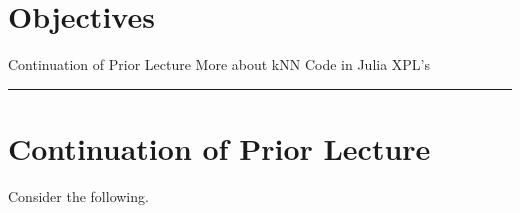 
\section*{Objectives}
\begin{outline}
    \1 Continuation of Prior Lecture
    \1 More about kNN
    \1 Code in Julia
    \1 XPL's
\end{outline}

\rule[0.0051in]{\textwidth}{0.00025in}
\section{Continuation of Prior Lecture}

Consider the following.

